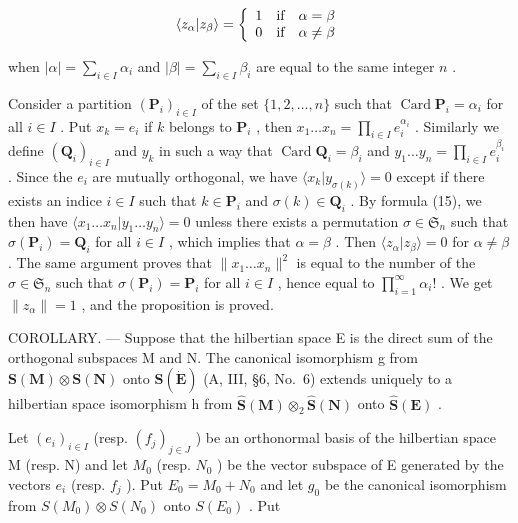 \[
\langle z _ {\alpha} | z _ {\beta} \rangle = \left\{ \begin{array}{l l} 1 & \text {if} \quad \alpha = \beta \\ 0 & \text {if} \quad \alpha \neq \beta \end{array} \right.
\]

when \(|\alpha| = \sum_{i \in I} \alpha_i\) and \(|\beta| = \sum_{i \in I} \beta_i\) are equal to the same integer \(n\) .

Consider a partition \((\mathbf{P}_i)_{i\in I}\) of the set \(\{1,2,\dots,n\}\) such that \(\operatorname{Card} \mathbf{P}_i = \alpha_i\) for all \(i\in I\) . Put \(x_k = e_i\) if \(k\) belongs to \(\mathbf{P}_i\) , then \(x_1\ldots x_n = \prod_{i\in I}e_i^{\alpha_i}\) . Similarly we define \((\mathbf{Q}_i)_{i\in I}\) and \(y_k\) in such a way that \(\operatorname{Card} \mathbf{Q}_i = \beta_i\) and \(y_1\ldots y_n = \prod_{i\in I}e_i^{\beta_i}\) . Since the \(e_i\) are mutually orthogonal, we have \(\langle x_k|y_{\sigma(k)}\rangle = 0\) except if there exists an indice \(i\in I\) such that \(k\in \mathbf{P}_i\) and \(\sigma (k)\in \mathbf{Q}_i\) . By formula (15), we then have \(\langle x_1\ldots x_n|y_1\ldots y_n\rangle = 0\) unless there exists a permutation \(\sigma \in \mathfrak{S}_n\) such that \(\sigma (\mathbf{P}_i) = \mathbf{Q}_i\) for all \(i\in I\) , which implies that \(\alpha = \beta\) . Then \(\langle z_{\alpha}|z_{\beta}\rangle = 0\) for \(\alpha \neq \beta\) . The same argument proves that \(\| x_1\ldots x_n\|^2\) is equal to the number of the \(\sigma \in \mathfrak{S}_n\) such that \(\sigma (\mathbf{P}_i) = \mathbf{P}_i\) for all \(i\in I\) , hence equal to \(\prod_{i=1}^{\infty}\alpha_i!\) . We get \(\| z_\alpha \| = 1\) , and the proposition is proved.

COROLLARY. --- Suppose that the hilbertian space E is the direct sum of the orthogonal subspaces M and N. The canonical isomorphism g from \(\mathbf{S}(\mathbf{M}) \otimes \mathbf{S}(\mathbf{N})\) onto \(\mathbf{S}(\dot{\mathbf{E}})\) (A, III, §6, No.~6) extends uniquely to a hilbertian space isomorphism h from \(\hat{\mathbf{S}}(\mathbf{M}) \otimes_{2} \hat{\mathbf{S}}(\mathbf{N})\) onto \(\hat{\mathbf{S}}(\mathbf{E})\) .

Let \((e_{i})_{i\in I}\) (resp. \((f_{j})_{j\in J}\) ) be an orthonormal basis of the hilbertian space M (resp. N) and let \(M_{0}\) (resp. \(N_{0}\) ) be the vector subspace of E generated by the vectors \(e_{i}\) (resp. \(f_{j}\) ). Put \(E_{0}=M_{0}+N_{0}\) and let \(g_{0}\) be the canonical isomorphism from \(S(M_{0})\otimes S(N_{0})\) onto \(S(E_{0})\) . Put

